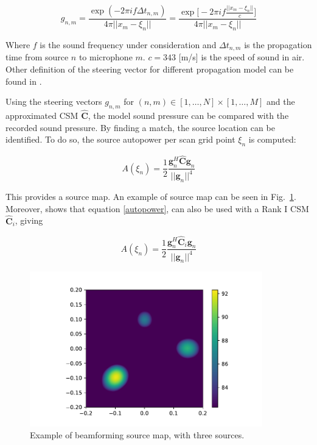 \documentclass[11pt,a4paper,twoside]{report}
\begin{document}
\begin{equation}
    g_{n,m} = \frac{\exp(-2 \pi i f \Delta t_{n,m})}{4\pi ||x_m -\xi_n||}
    = \frac{\exp \biggl[ -2 \pi i f \frac{||x_m -\xi_n||}{c} \biggr] }{4\pi ||x_m -\xi_n||}  
\end{equation}


Where $f$ is the sound frequency under consideration and $\Delta t_{n,m}$ is the propagation time from source $n$ to microphone $m$. $c = 343$ [m/s] is the speed of sound in air. Other definition of the steering vector for different propagation model can be found in \cite{sarradj2012three}.

Using the steering vectors $g_{n,m}$ for $(n,m) \in [1, \dots, N] \times [1, \dots, M]$ and the approximated CSM $\hat{\mathbf{C}}$, the model sound pressure can be compared with the recorded sound pressure. By finding a match, the source location can be identified. To do so, the source autopower per scan grid point $\xi_n$ is computed:

\begin{equation}
    \label{autopower}
    A(\xi_n) = \frac{1}{2} \frac{\mathbf{g}_{n}^H \hat{\mathbf{C}} \mathbf{g}_{n}}{||\mathbf{g}_{n}||^4}
\end{equation}

This provides a source map. An example of source map can be seen in Fig.~\ref{fig:beamforming_example}. Moreover, \cite{sarradj2010fast} shows that equation \ref{autopower}, can also be used with a Rank I CSM $\hat{\mathbf{C}}_i$, giving

\begin{equation}
    A(\xi_n) = \frac{1}{2} \frac{\mathbf{g}_{n}^H \hat{\mathbf{C}}_i \mathbf{g}_{n}}{||\mathbf{g}_{n}||^4}
\end{equation}

\begin{figure}
    \centering
    \includegraphics[width=0.9\textwidth]{figs/beamforming_example.pdf}
    \caption{Example of beamforming source map, with three sources.}
    \label{fig:beamforming_example}    
\end{figure}
\end{document}
